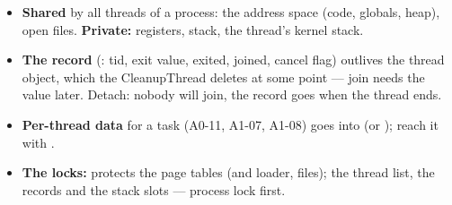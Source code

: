 \documentclass[11pt]{report}
\begin{document}
\begin{center}
\end{center}

\begin{itemize}
\item \textbf{Shared} by all threads of a process: the address space (code, globals, heap), open
  files. \textbf{Private:} registers, stack, the thread's kernel stack.
\item \textbf{The record} (: tid, exit value, exited, joined, cancel flag)
  outlives the thread object, which the CleanupThread deletes at some point --- join needs the value
  later. Detach: nobody will join, the record goes when the thread ends.
\item \textbf{Per-thread data} for a task (A0-11, A1-07, A1-08) goes into  (or
  ); reach it with .
\item \textbf{The locks:}  protects the page tables (and loader,
  files);  the thread list, the records and the stack slots --- process lock first.
\end{itemize}
\end{document}
